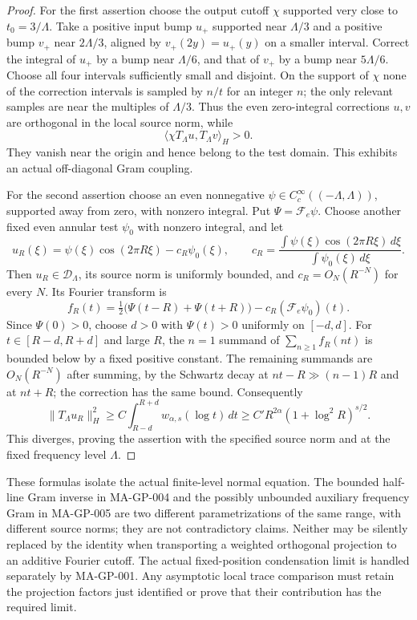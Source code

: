 \begin{proof}
For the first assertion choose the output cutoff $\chi$
supported very close to $t_0=3/\Lambda$.
Take a positive input bump $u_+$ supported near $\Lambda/3$
and a positive bump $v_+$ near $2\Lambda/3$, aligned by
$v_+(2y)=u_+(y)$ on a smaller interval.
Correct the integral of $u_+$ by a bump near $\Lambda/6$,
and that of $v_+$ by a bump near $5\Lambda/6$.
Choose all four intervals sufficiently small and disjoint.
On the support of $\chi$ none of the correction intervals
is sampled by $n/t$ for an integer $n$; the only relevant
samples are near the multiples of $\Lambda/3$.
Thus the even zero-integral corrections $u,v$ are orthogonal
in the local source norm, while
\[
                    \langle\chi T_\Lambda u,T_\Lambda v\rangle_H>0.
 \tag{MA-GP.56}
\]
They vanish near the origin and hence belong to the test
domain.  This exhibits an actual off-diagonal Gram coupling.

For the second assertion choose an even nonnegative
$\psi\in C_c^\infty((-\Lambda,\Lambda))$, supported away
from zero, with nonzero integral.  Put $\Psi=\mathcal F_e\psi$.
Choose another fixed even annular test $\psi_0$ with
nonzero integral, and let
\[
 u_R(\xi)=\psi(\xi)\cos(2\pi R\xi)-c_R\psi_0(\xi),
 \qquad c_R=\frac{\int\psi(\xi)\cos(2\pi R\xi)\,d\xi}
                         {\int\psi_0(\xi)\,d\xi}.
 \tag{MA-GP.57}
\]
Then $u_R\in\mathscr D_\Lambda$, its source norm is
uniformly bounded, and $c_R=O_N(R^{-N})$ for every $N$.
Its Fourier transform is
\[
 f_R(t)=\tfrac12\bigl(\Psi(t-R)+\Psi(t+R)\bigr)
                                  -c_R(\mathcal F_e\psi_0)(t).
 \tag{MA-GP.58}
\]
Since $\Psi(0)>0$, choose $d>0$ with $\Psi(t)>0$
uniformly on $[-d,d]$.  For $t\in[R-d,R+d]$ and large
$R$, the $n=1$ summand of $\sum_{n\ge1}f_R(nt)$ is
bounded below by a fixed positive constant.  The remaining
summands are $O_N(R^{-N})$ after summing, by the Schwartz
decay at $nt-R\gg(n-1)R$ and at $nt+R$; the correction
has the same bound.  Consequently
\[
 \|T_\Lambda u_R\|_H^2
   \ge C\int_{R-d}^{R+d}w_{\alpha,s}(\log t)\,dt
   \ge C'R^{2\alpha}(1+\log^2R)^{s/2}.
 \tag{MA-GP.59}
\]
This diverges, proving the assertion with the specified
source norm and at the fixed frequency level $\Lambda$.
\end{proof}

These formulas isolate the actual finite-level normal equation.
The bounded half-line Gram inverse in MA-GP-004 and the
possibly unbounded auxiliary frequency Gram in MA-GP-005
are two different parametrizations of the same range, with
different source norms; they are not contradictory claims.
Neither may be silently replaced by the identity when
transporting a weighted orthogonal projection to an additive
Fourier cutoff.  The actual fixed-position condensation limit
is handled separately by MA-GP-001.  Any asymptotic local
trace comparison must retain the projection factors just
identified or prove that their contribution has the required
limit.

